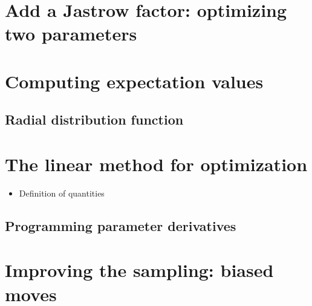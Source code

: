 \documentclass[12pt]{article}
\begin{document}
\section{Add a Jastrow factor: optimizing two parameters} 

\section{Computing expectation values}

\subsection{Radial distribution function} 

\section{The linear method for optimization} 

\begin{itemize}
\item Definition of quantities
\end{itemize}

\subsection{Programming parameter derivatives}


\section{Improving the sampling: biased moves} 
\end{document}
